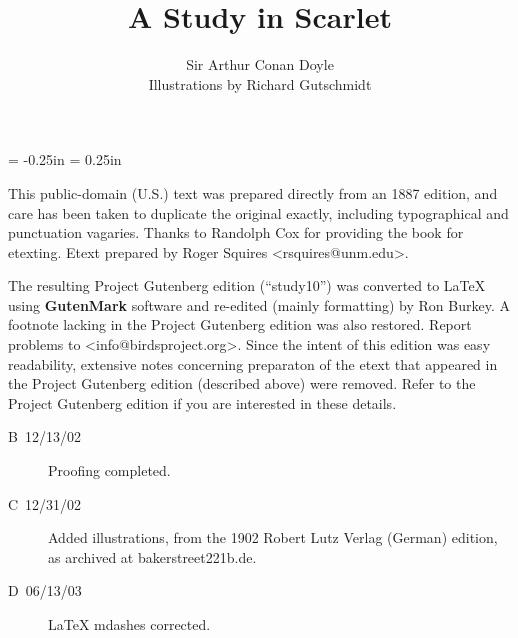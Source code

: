 \documentclass[12pt,english]{book}
\begin{document}
\sloppy

\evensidemargin = -0.25in
\oddsidemargin = 0.25in
\pagestyle{empty}

\newcommand{\mdsh}[1]{\mbox{#1}\linebreak[1]}

\date{}

\raggedbottom


\title{A Study in Scarlet}


\author{Sir Arthur Conan Doyle\\
{\normalsize Illustrations by Richard Gutschmidt}}

\maketitle
{}

\noindent This public-domain (U.S.) text was prepared directly from
an 1887 edition, and care has been taken to duplicate the original
exactly, including typographical and punctuation vagaries. Thanks
to Randolph Cox for providing the book for etexting. Etext prepared
by Roger Squires <rsquires@unm.edu>.

\bigskip{}
\noindent The resulting Project Gutenberg edition ({}``study10'')
was converted to \LaTeX{} using \textbf{GutenMark} software and re-edited
(mainly formatting) by Ron Burkey. A footnote lacking in the Project
Gutenberg edition was also restored. Report problems to <info@birdsproject.org>.
Since the intent of this edition was easy readability, extensive notes
concerning preparaton of the etext that appeared in the Project Gutenberg
edition (described above) were removed. Refer to the Project Gutenberg
edition if you are interested in these details.

\begin{description}
\item [B~12/13/02]Proofing completed.
\item [C~12/31/02]Added illustrations, from the 1902 Robert Lutz Verlag
(German) edition, as archived at bakerstreet221b.de.
\item [D~06/13/03]\LaTeX{} mdashes corrected.
\end{description}

\frontmatter

\pagestyle{myheadings} {\footnotesize \tableofcontents{}}\newpage


\mainmatter
\end{document}
